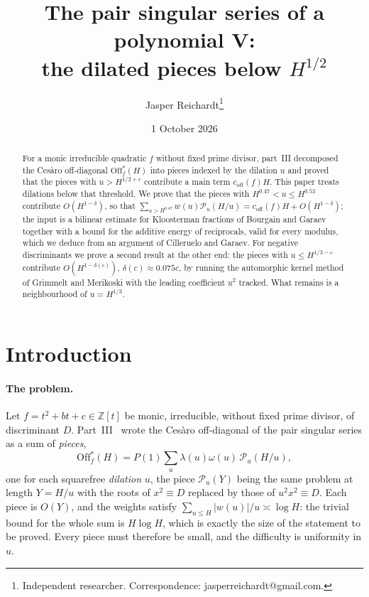 \documentclass[11pt,a4paper]{article}
\title{The pair singular series of a polynomial V:\\ the dilated pieces below $H^{1/2}$}
\author{Jasper Reichardt\thanks{Independent researcher. Correspondence: jasperreichardt@gmail.com.}}
\date{1 October 2026}
\newcommand{\Z}{\mathbb{Z}}\newcommand{\R}{\mathbb{R}}\newcommand{\Off}{\mathrm{Off}}\newcommand{\e}{\mathrm{e}}
\begin{document}
\maketitle
\begin{abstract}
For a monic irreducible quadratic $f$ without fixed prime divisor, part~III decomposed the Ces\`aro off-diagonal $\Off^\ast_f(H)$ into pieces indexed by the dilation $u$ and
proved that the pieces with $u>H^{1/2+\varepsilon}$ contribute a main term $c_{\mathrm{off}}(f)H$. This paper treats dilations below that threshold. We prove that the pieces with
$H^{0.47}<u\le H^{0.53}$ contribute $O(H^{1-\delta})$, so that $\sum_{u>H^{0.47}}w(u)\mathcal P_u(H/u)=c_{\mathrm{off}}(f)H+O(H^{1-\delta})$; the input is a bilinear estimate for
Kloosterman fractions of Bourgain and Garaev together with a bound for the additive energy of reciprocals, valid for every modulus, which we deduce from an argument of
Cilleruelo and Garaev. For negative discriminants we prove a second result at the other end: the pieces with $u\le H^{1/3-c}$ contribute $O(H^{1-\delta(c)})$, $\delta(c)\approx0.075c$, by running the
automorphic kernel method of Grimmelt and Merikoski with the leading coefficient $u^2$ tracked. What remains is a neighbourhood of $u=H^{1/3}$.
\end{abstract}
\section{Introduction}
\paragraph{The problem.} Let $f=t^2+bt+c\in\Z[t]$ be monic, irreducible, without fixed prime divisor, of discriminant $D$. Part~III~\cite{ReichardtIII} wrote the Ces\`aro
off-diagonal of the pair singular series as a sum of \emph{pieces},
\[
\Off^\ast_f(H)=P(1)\sum_{u}\lambda(u)\omega(u)\,\mathcal P_u(H/u),
\]
one for each squarefree \emph{dilation} $u$, the piece $\mathcal P_u(Y)$ being the same problem at length $Y=H/u$ with the roots of $x^2\equiv D$ replaced by those of
$u^2x^2\equiv D$. Each piece is $O(Y)$, and the weights satisfy $\sum_{u\le H}|w(u)|/u\asymp\log H$: the trivial bound for the whole sum is $H\log H$, which is exactly the size
of the statement to be proved. Every piece must therefore be small, and the difficulty is uniformity in $u$.
\end{document}
